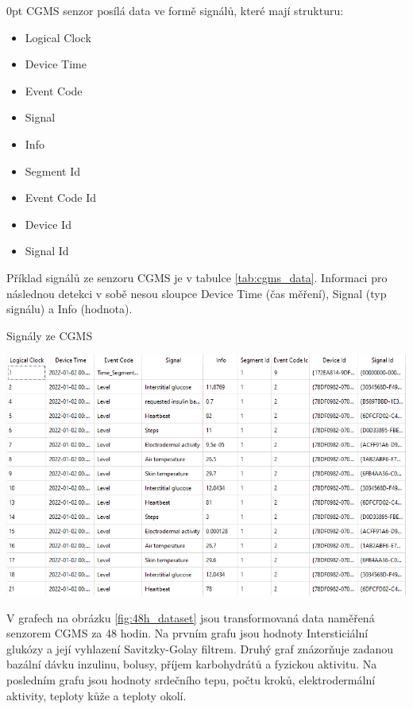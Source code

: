 \begin{setlength}{\parskip}{0pt}
CGMS senzor posílá data ve formě signálů, které mají strukturu:
\begin{itemize}
\setlength\itemsep{0em}
\item Logical Clock
\item Device Time
\item Event Code
\item Signal
\item Info
\item Segment Id
\item Event Code Id
\item Device Id
\item Signal Id
\end{itemize}
\end{setlength}

Příklad signálů ze senzoru CGMS je v tabulce \ref{tab:cgms_data}. Informaci pro následnou detekci v sobě nesou sloupce Device Time (čas měření), Signal (typ signálu) a Info (hodnota).

\begin{table}[H]
\caption{Signály ze CGMS}
\label{tab:cgms_data}
\centering
\includegraphics[width=1\textwidth]{img/cho/cgms_data.png}
\end{table}

V grafech na obrázku \ref{fig:48h_dataset} jsou transformovaná data naměřená senzorem CGMS za 48 hodin. Na prvním grafu jsou hodnoty Intersticiální glukózy a její vyhlazení Savitzky-Golay filtrem. Druhý graf znázorňuje zadanou bazální dávku inzulinu, bolusy, příjem karbohydrátů a fyzickou aktivitu. Na posledním grafu jsou hodnoty srdečního tepu, počtu kroků, elektrodermální aktivity, teploty kůže a teploty okolí.

